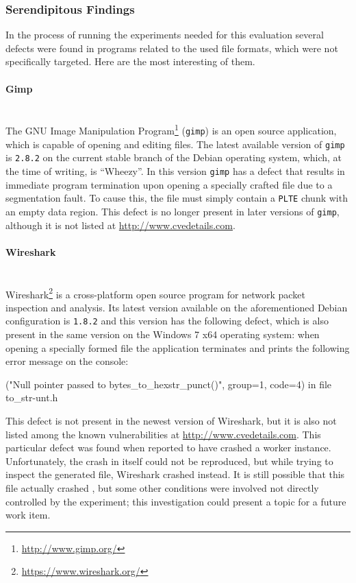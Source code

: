 
\subsubsection{Serendipitous Findings}
In the process of running the experiments needed for this evaluation several defects were found in programs
related to the used file formats, which were not specifically targeted. Here are the most interesting of them.
\paragraph{Gimp} ~\\
The GNU Image Manipulation Program\footnote{\url{http://www.gimp.org/}} (\texttt{gimp}) is an open source
application, which is capable of opening and editing \png files. The latest available version of \texttt{gimp}
is \texttt{2.8.2} on the current stable branch of the Debian operating system, which, at the time of writing,
is ``Wheezy''. In this version \texttt{gimp} has a defect that results in immediate program termination upon
opening a specially crafted \png file due to a segmentation fault. To cause this, the \png file must
simply contain a \texttt{PLTE} chunk with an empty data region. This defect is no longer present in later
versions of \texttt{gimp}, although it is not listed at \url{http://www.cvedetails.com}.
\paragraph{Wireshark} ~\\
Wireshark\footnote{\url{https://www.wireshark.org/}} is a cross-platform open source program for network packet
inspection and analysis. Its latest version available on the aforementioned Debian configuration is
\texttt{1.8.2} and this version has the following defect, which is also present in the same version on the
Windows 7 x64 operating system: when opening a specially formed \pcap file the application terminates and
prints the following error message on the console:

{\small ("Null pointer passed to bytes\_to\_hexstr\_punct()", group=1, code=4) in file to\_str-unt.h}

This defect is not present in the newest version of Wireshark, but it is also not listed among the known
vulnerabilities at \url{http://www.cvedetails.com}. This particular defect was found when \xmlmate reported to
have crashed a \libpcap worker instance. Unfortunately, the crash in \libpcap itself could not be reproduced,
but while trying to inspect the generated \pcap file, Wireshark crashed instead. It is still possible that
this file actually crashed \libpcap, but some other conditions were involved not directly controlled by the
experiment; this investigation could present a topic for a future work item.
